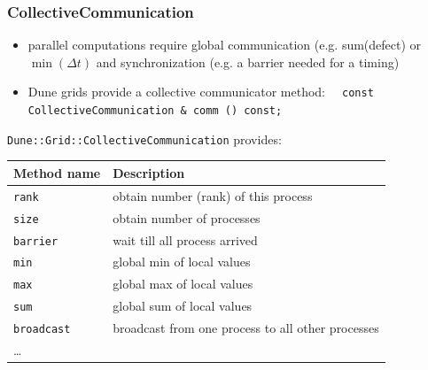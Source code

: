 \begin{frame}[fragile]
  \frametitle<presentation>{CollectiveCommunication}
  \begin{itemize}
  \item parallel computations require global communication (e.g. sum(defect) or $\min(\Delta t)$ 
        and synchronization (e.g. a barrier needed for a timing)
  \item Dune grids provide a collective communicator method:
    \lstinline!  const CollectiveCommunication & comm () const;!
  \end{itemize}
  
  \lstinline[basicstyle=\normalfont\ttfamily]!Dune::Grid::CollectiveCommunication! provides:
 \begin{center}
    \scriptsize
    \begin{tabular}{l|l}
      \hline
      Method name & Description\\\hline
      \lstinline!rank! & obtain number (rank) of this process\\
      \lstinline!size! & obtain number of processes \\
      \lstinline!barrier! & wait till all process arrived\\
      \lstinline!min! & global min of local values\\
      \lstinline!max! & global max of local values\\
      \lstinline!sum! & global sum of local values\\
      \lstinline!broadcast! & broadcast from one process to all other processes\\
      \dots\\
      \hline
    \end{tabular}    
 \end{center}
  
\end{frame}

